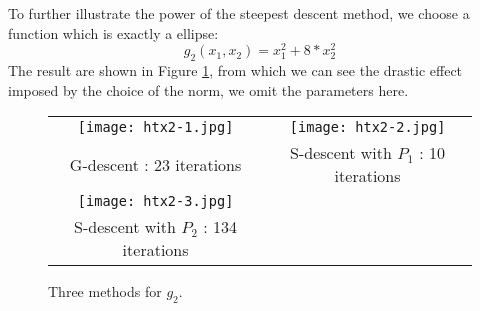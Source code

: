 \documentclass{article}
\begin{document}
To further illustrate the power of the steepest descent method, we choose a function which is exactly a ellipse:
\begin{displaymath}
g_2(x_1, x_2) = x_1 ^ 2 + 8 * x_2 ^ 2
\end{displaymath}
The result are shown in Figure \ref{fig:htx2}, from which we can see the drastic effect imposed by the choice of the norm, we omit the parameters here.
\begin{figure}
        \begin{tabular}{cc}
            \texttt{[image: htx2-1.jpg]} &
            \texttt{[image: htx2-2.jpg]} \\
            G-descent : 23 iterations&
            S-descent with $P_1$ : 10 iterations \\
            \texttt{[image: htx2-3.jpg]} \\
            S-descent with $P_2$ : 134 iterations
        \end{tabular}
    \caption{\label{fig:htx2}Three methods for $g_2$.}
\end{figure}
\end{document}
